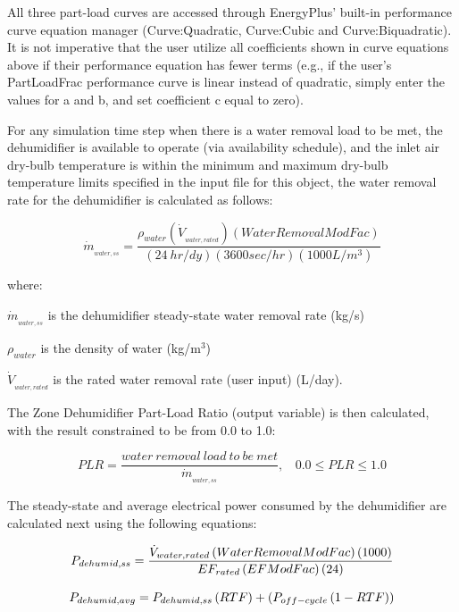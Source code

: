 All three part-load curves are accessed through EnergyPlus' built-in performance curve equation manager (Curve:Quadratic, Curve:Cubic and Curve:Biquadratic). It is not imperative that the user utilize all coefficients shown in curve equations above if their performance equation has fewer terms (e.g., if the user's PartLoadFrac performance curve is linear instead of quadratic, simply enter the values for a and b, and set coefficient c equal to zero).

For any simulation time step when there is a water removal load to be met, the dehumidifier is available to operate (via availability schedule), and the inlet air dry-bulb temperature is within the minimum and maximum dry-bulb temperature limits specified in the input file for this object, the water removal rate for the dehumidifier is calculated as follows:

\begin{equation}
{\dot m_{_{water,ss}}} = \frac{{{\rho_{water}}\left( {{{\dot V}_{_{water,rated}}}} \right)\left( {WaterRemovalModFac} \right)}}{{\left( {24~hr/dy} \right)\left( {3600sec/hr} \right)\left( {1000L/{m^3}} \right)}}
\end{equation}

where:

\({\dot m_{_{water,ss}}}\) is the dehumidifier steady-state water removal rate (kg/s)

\({\rho_{water}}\) is the density of water (kg/m\(^{3}\))

\({\dot V_{_{water,rated}}}\) is the rated water removal rate (user input) (L/day).

The Zone Dehumidifier Part-Load Ratio (output variable) is then calculated, with the result constrained to be from 0.0 to 1.0:

\begin{equation}
PLR = \frac{{water~removal~load~to~be~met}}{{{{\dot m}_{_{water,ss}}}}},~~~~0.0 \leq PLR \leq 1.0
\end{equation}

The steady-state and average electrical power consumed by the dehumidifier are calculated next using the following equations:

\begin{equation}
  P_{dehumid,ss} = \frac{\dot{V}_{water,rated}\PB{WaterRemovalModFac}\PB{1000}}{EF_{rated}\PB{EFModFac}\PB{24}}
\end{equation}

\begin{equation}
  P_{dehumid,avg} = P_{dehumid,ss} \PB{RTF} + \PB{P_{off-cycle}\PB{1 - RTF}}
\end{equation}

